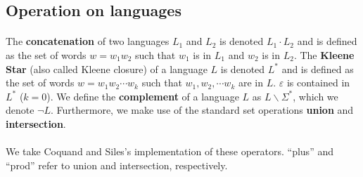     \subsection{Operation on languages}

    \paragraph{}

    The \textbf{concatenation} of two languages $L_1$ and $L_2$ is denoted $L_1 \cdot L_2$ and is defined as the set of words $w = w_1 w_2$ such that $w_1$ is in $L_1$ and $w_2$ is in $L_2$.
    The \textbf{Kleene Star} (also called Kleene closure) of a language $L$ is denoted $L^*$ and is defined as the set of words $w = w_1 w_2 \cdots w_k$ such that $w_1, w_2, \cdots w_k$ are in $L$. $\varepsilon$ is contained in $L^*$ ($k=0$).
    We define the \textbf{complement} of a language $L$ as $L \backslash \Sigma^*$, which we denote $\neg L$.
    Furthermore, we make use of the standard set operations \textbf{union} and \textbf{intersection}.

    \paragraph{}
    We take Coquand and Siles's \cite{DBLP:conf/cpp/CoquandS11} implementation of these operators. ``plus'' and ``prod'' refer to union and intersection, respectively.



